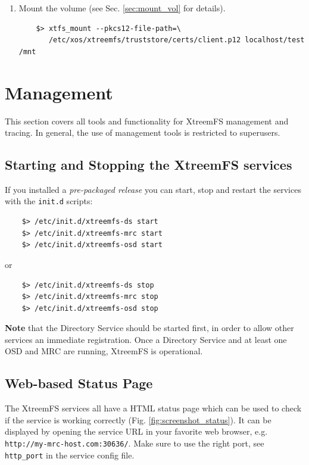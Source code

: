 \documentclass[a4paper,10pt]{book}
\begin{document}
\begin{enumerate}
 \item Mount the volume (see Sec. \ref{sec:mount_vol} for details).
	\begin{verbatim}
	$> xtfs_mount --pkcs12-file-path=\
	   /etc/xos/xtreemfs/truststore/certs/client.p12 localhost/test /mnt
	\end{verbatim}

\end{enumerate}


\section{Management}
This section covers all tools and functionality for XtreemFS management and tracing. In general, the use of management tools is restricted to superusers.

\subsection{Starting and Stopping the XtreemFS services}
\label{sec:startstopservice}

If you installed a \emph{pre-packaged release} you can start, stop and restart the services with the \texttt{init.d} scripts:
	\begin{verbatim}
	$> /etc/init.d/xtreemfs-ds start
	$> /etc/init.d/xtreemfs-mrc start
	$> /etc/init.d/xtreemfs-osd start
	\end{verbatim}
or
	\begin{verbatim}
	$> /etc/init.d/xtreemfs-ds stop
	$> /etc/init.d/xtreemfs-mrc stop
	$> /etc/init.d/xtreemfs-osd stop
	\end{verbatim}


\textbf{Note} that the Directory Service should be started first, in order to allow other services an immediate registration. Once a Directory Service and at least one OSD and MRC are running, XtreemFS is operational.

\subsection{Web-based Status Page}

The XtreemFS services all have a HTML status page which can be used to check if the service is working correctly (Fig. \ref{fig:screenshot_status}). It can be displayed by opening the service URL in your favorite web browser, e.g.\\ \texttt{http://my-mrc-host.com:30636/}. Make sure to use the right port, see \texttt{http\_port} in the service config file.
\end{document}
